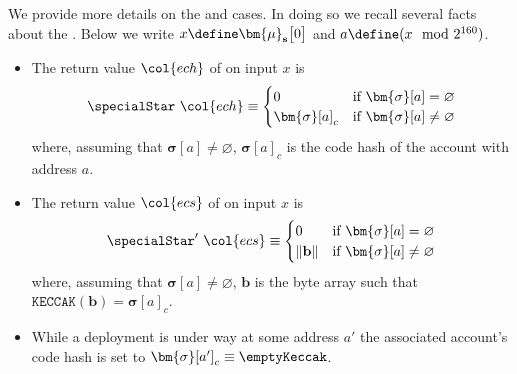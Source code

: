 \saNote{}
\label{hub: instruction handling: account: extcodesize and extcodehash: subtleties in the EVM}
We provide more details on the  and  cases.
In doing so we recall several facts about the \evm{}.
Below we write $x \define \bm{\mu}_\textbf{s}\big[0\big]$ and $a \define (x \mod 2^{160})$.
\begin{itemize}
	\item 
		The return value $\col{ech}$ of  on input $x$ is
		\[
			\specialStar ~ \col{ech}
			\equiv
			\begin{cases}
				0                & \text{if $\bm{\sigma}[a] =    \varnothing$} \\
				\bm{\sigma}[a]_c & \text{if $\bm{\sigma}[a] \neq \varnothing$} \\
			\end{cases}
		\]
		where, assuming that $\bm{\sigma}[a] \neq \varnothing$,
		$\bm{\sigma}[a]_c$ is the code hash of the account with address $a$.
	\item 
		The return value $\col{ecs}$ of  on input $x$ is
		\[
			\specialStar' ~ \col{ecs}
			\equiv
			\begin{cases}
				0              & \text{if $\bm{\sigma}[a] = \varnothing$}     \\
				\| \mathbf{b} \| & \text{if $\bm{\sigma}[a] \neq \varnothing$} \\
			\end{cases}
		\]
		where, assuming that $\bm{\sigma}[a] \neq \varnothing$,
		$\mathbf{b}$ is the byte array such that $\texttt{KECCAK}(\mathbf{b}) = \bm{\sigma}[a]_c$.
	\item 
		While a deployment is under way at some address $a'$ the associated account's code hash is set to $\bm{\sigma}[a']_c \equiv \emptyKeccak$.
\end{itemize}

